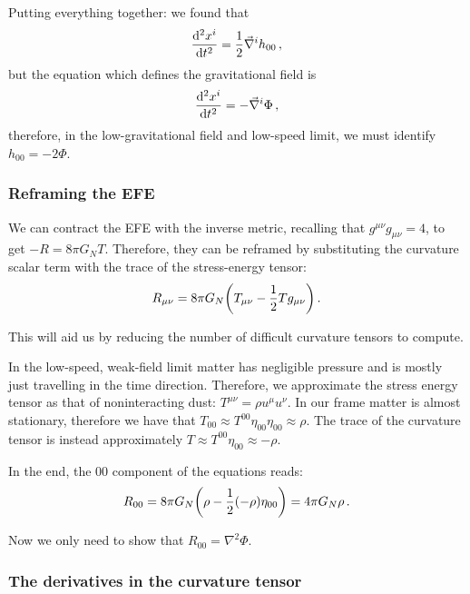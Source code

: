 \documentclass[main.tex]{subfiles}
\begin{document}
Putting everything together: we found that 
%
\begin{equation}
  \dv[2]{x^{i}}{t} = \frac{1}{2}\vec{\nabla}^{i}h_{00}
\,,
\end{equation}
%
but the equation which defines the gravitational field is 
%
\begin{equation}
  \dv[2]{x^{i}}{t} = - \vec{\nabla}^{i} \Phi 
\,,
\end{equation}
%
therefore, in the low-gravitational field and low-speed limit, we must identify \(h_{00} = -2 \Phi \).

\subsubsection{Reframing the EFE}

We can contract the EFE with the inverse metric, recalling that \(g^{\mu \nu }g_{\mu \nu }= 4\), to get \(-R = 8 \pi G_N T\). Therefore, they can be reframed by substituting the curvature scalar term with the trace of the stress-energy tensor: 
%
\begin{equation}
  R_{\mu \nu } = 8 \pi G_N \qty(T_{ \mu \nu }- \frac{1}{2} T g_{\mu \nu }) 
\,.
\end{equation}

This will aid us by reducing the number of difficult curvature tensors to compute.

In the low-speed, weak-field limit matter has negligible pressure and is mostly just travelling in the time direction. Therefore, we approximate the stress energy tensor as that of noninteracting dust: \(T^{\mu \nu } = \rho u^{\mu } u^{\nu }\). In our frame matter is almost stationary, therefore we have that \(T_{00} \approx T^{00} \eta_{00} \eta_{00} \approx \rho\).
The trace of the curvature tensor is instead approximately \(T \approx T^{00 } \eta_{00} \approx - \rho\). 

In the end, the 00 component of the equations reads: 
%
\begin{equation}
  R_{00 } = 8 \pi G_N \qty(\rho - \frac{1}{2} (-\rho) \eta_{00 } ) = 4 \pi G_N \rho 
\,.
\end{equation}
%

Now we only need to show that \(R_{00 } = \nabla^2 \Phi \).

\subsubsection{The derivatives in the curvature tensor}
\end{document}

